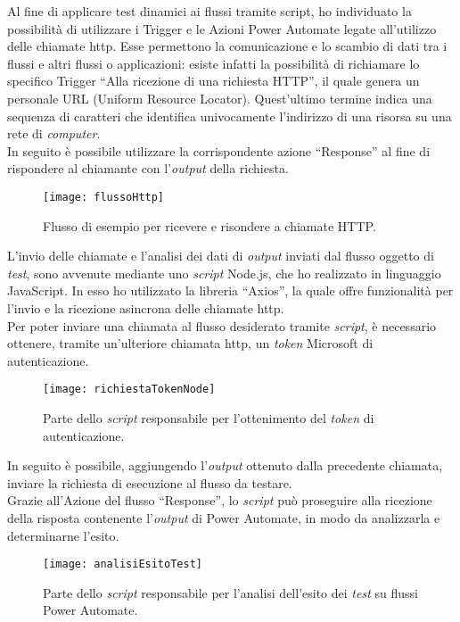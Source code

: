 Al fine di applicare test dinamici ai flussi tramite script, ho individuato la possibilità di utilizzare i Trigger e le Azioni Power Automate legate all'utilizzo delle chiamate \gls{http}.
Esse permettono la comunicazione e lo scambio di dati tra i flussi e altri flussi o applicazioni: esiste infatti la possibilità di richiamare lo specifico Trigger “Alla ricezione di una richiesta HTTP”, il quale genera un personale URL (Uniform Resource Locator).
Quest'ultimo termine indica una sequenza di caratteri che identifica univocamente l'indirizzo di una risorsa su una rete di \emph{computer}.\\
In seguito è possibile utilizzare la corrispondente azione “Response” al fine di rispondere al chiamante con l'\emph{output} della richiesta.\\
\begin{figure}[htbp] 
    \centering 
    \texttt{[image: flussoHttp]} 
    \caption{Flusso di esempio per ricevere e risondere a chiamate HTTP.}
    \label{fig:flussoHttp}
\end{figure}
\newline L'invio delle chiamate e l'analisi dei dati di \emph{output} inviati dal flusso oggetto di \emph{test}, sono avvenute mediante uno \emph{script} Node.js, che ho realizzato in linguaggio JavaScript.
In esso ho utilizzato la libreria “Axios”, la quale offre funzionalità per l'invio e la ricezione asincrona delle chiamate \gls{http}.\\
Per poter inviare una chiamata al flusso desiderato tramite \emph{script}, è necessario ottenere, tramite un'ulteriore chiamata \gls{http}, un \emph{token} Microsoft di autenticazione.
\begin{figure}[htbp] 
    \centering 
    \texttt{[image: richiestaTokenNode]} 
    \caption{Parte dello \emph{script} responsabile per l'ottenimento del \emph{token} di autenticazione.}
    \label{fig:richiestaTokenNode}
\end{figure}
\newline In seguito è possibile, aggiungendo l'\emph{output} ottenuto dalla precedente chiamata, inviare la richiesta di esecuzione al flusso da testare.\\
Grazie all'Azione del flusso “Response”, lo \emph{script} può proseguire alla ricezione della risposta contenente l'\emph{output} di Power Automate, in modo da analizzarla e determinarne l'esito.
\begin{figure}[htbp] 
    \centering 
    \texttt{[image: analisiEsitoTest]} 
    \caption{Parte dello \emph{script} responsabile per l'analisi dell'esito dei \emph{test} su flussi Power Automate.}
    \label{fig:analisiEsitoTest}
\end{figure}
